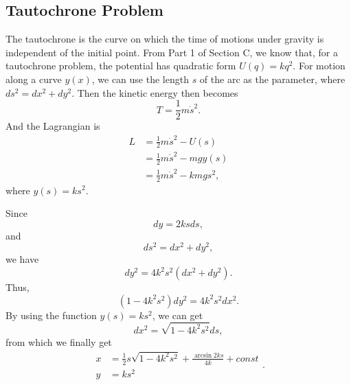 \documentclass[%
 reprint,
 amsmath,amssymb,
 aps,
]{revtex4-1}
\begin{document}
\subsection{\label{sec:citeref}Tautochrone Problem}
The tautochrone is the curve on which the time of motions under gravity is independent of the initial point. From Part 1 of Section C, we know that, for a tautochrone problem, the potential has quadratic form $U(q)=kq^2$. For motion along a curve $y(x)$, we can use the length $s$ of the arc as the parameter, where $ds^2=dx^2+dy^2$. Then the kinetic energy then becomes
\begin{equation}
    T=\frac{1}{2}m\dot{s}^2.
\end{equation}
And the Lagrangian is
\begin{equation}
\begin{aligned}
    L&=\frac{1}{2}m\dot{s}^2-U(s)
    \\&=\frac{1}{2}m\dot{s}^2-mgy(s)
    \\&=\frac{1}{2}m\dot{s}^2-kmgs^2,
\end{aligned}
\end{equation}
where $y(s)=ks^2$.

Since 
\begin{equation}
    dy=2ks ds,
\end{equation}
and
\begin{equation}
    ds^2=dx^2+dy^2,
\end{equation}
we have
\begin{equation}
dy^2=4k^2s^2(dx^2+dy^2).
\end{equation}
Thus,
\begin{equation}
    (1-4k^2s^2)dy^2=4k^2s^2dx^2.
\end{equation}
By using the function $y(s)=ks^2$, we can get
\begin{equation}
    dx^2=\sqrt{1-4k^2s^2}ds,
\end{equation}
from which we finally get
\begin{equation}
\begin{aligned}
x&=\frac{1}{2}s\sqrt{1-4k^2s^2}+\frac{\arcsin{2ks}}{4k}+const
\\y&=ks^2
\end{aligned}.
\label{Eq8}
\end{equation}
\end{document}

